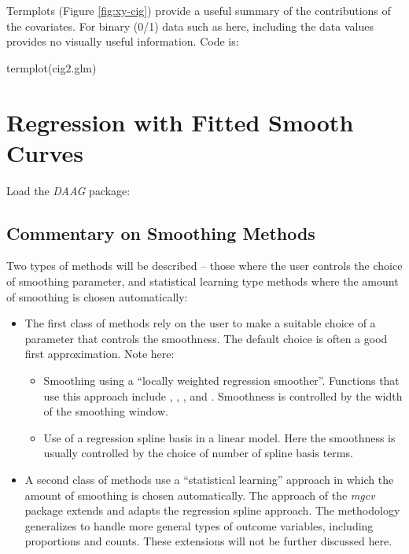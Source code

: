 Termplots (Figure \ref{fig:xy-cig}) provide a useful summary of the
contributions of the covariates.  For binary (0/1) data such as here,
including the data values provides no visually useful information.
Code is:
\begin{Schunk}
\begin{Sinput}
termplot(cig2.glm)
\end{Sinput}
\end{Schunk}

\section{Regression with Fitted Smooth Curves}

Load the {\em DAAG} package:


\subsection*{Commentary  on Smoothing Methods}

Two types of methods will be described -- those where the user
controls the choice of smoothing parameter, and statistical learning
type methods where the amount of smoothing is chosen automatically:
\begin{itemize}
\item The first class of methods rely on the user to make a suitable
  choice of a parameter that controls the smoothness.  The default
choice is often a good first approximation.  Note here:
\begin{itemize}
\item Smoothing using a ``locally weighted regression
smoother''. Functions that use this approach include 
, , , 
and .  Smoothness
is controlled by the width of the smoothing window.
\item Use of a regression spline basis in a linear model.  Here the smoothness
is usually controlled by the choice of number of spline basis terms.
\end{itemize}
\item A second class of methods use a ``statistical learning''
  approach in which the amount of smoothing is chosen automatically.
  The approach of the \textit{mgcv} package extends and adapts the
  regression spline approach.  The methodology
  generalizes to handle more general types of outcome variables,
  including proportions and counts.  These extensions will not be
  further discussed here.
\end{itemize}

